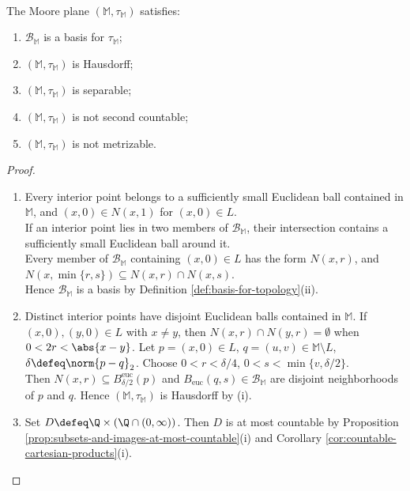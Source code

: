 \begin{counterexample} \label{cex:moore-plane-separable-hausdorff-not-metrizable} \\
The Moore plane $(\mathbb{M},\tau_{\mathbb{M}})$ satisfies:
\begin{enumerate}[label=(\roman*)]
\setlength{\itemsep}{0pt}
\item $\mathcal{B}_{\mathbb{M}}$ is a basis for $\tau_{\mathbb{M}}$;
\item $(\mathbb{M},\tau_{\mathbb{M}})$ is Hausdorff;
\item $(\mathbb{M},\tau_{\mathbb{M}})$ is separable;
\item $(\mathbb{M},\tau_{\mathbb{M}})$ is not second countable;
\item $(\mathbb{M},\tau_{\mathbb{M}})$ is not metrizable.
\end{enumerate}
\begin{proof}
\begin{enumerate}[label=(\roman*)]
\setlength{\itemsep}{0pt}
\item Every interior point belongs to a sufficiently small Euclidean ball contained in $\mathbb{M}$, and $(x,0)\in N(x,1)$ for $(x,0)\in L$.\\
If an interior point lies in two members of $\mathcal{B}_{\mathbb{M}}$, their intersection contains a sufficiently small Euclidean ball around it.\\
Every member of $\mathcal{B}_{\mathbb{M}}$ containing $(x,0)\in L$ has the form $N(x,r)$, and $N(x,\min\{r,s\})\subseteq N(x,r)\cap N(x,s)$.\\
Hence $\mathcal{B}_{\mathbb{M}}$ is a basis by Definition \ref{def:basis-for-topology}(ii).
\item Distinct interior points have disjoint Euclidean balls contained in $\mathbb{M}$. If $(x,0),(y,0)\in L$ with $x\neq y$, then $N(x,r)\cap N(y,r)=\emptyset$ when $0<2r<\abs{x-y}$. Let $p=(x,0)\in L$, $q=(u,v)\in\mathbb{M}\setminus L$, $\delta\defeq\norm{p-q}_2$. Choose $0<r<\delta/4$, $0<s<\min\{v,\delta/2\}$.\\
Then $N(x,r)\subseteq B_{\delta/2}^{\mathrm{euc}}(p)$ and $B_{\mathrm{euc}}(q,s)\in\mathcal{B}_{\mathbb{M}}$ are disjoint neighborhoods of $p$ and $q$. Hence $(\mathbb{M},\tau_{\mathbb{M}})$ is Hausdorff by (i).
\item Set $D\defeq\Q\times(\Q\cap(0,\infty))$. Then $D$ is at most countable by Proposition \ref{prop:subsets-and-images-at-most-countable}(i) and Corollary \ref{cor:countable-cartesian-products}(i).\\

\end{enumerate}
\end{proof}
\end{counterexample}
